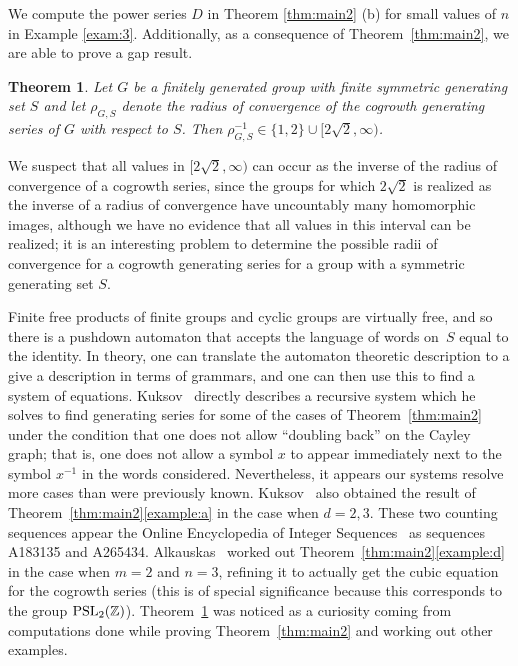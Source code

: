 \documentclass[11pt]{amsart}
\newtheorem{theorem}{Theorem}[section]
\theoremstyle{definition}
\begin{document}
We compute the power series $D$ in Theorem \ref{thm:main2} (b) for small values of $n$ in Example \ref{exam:3}. Additionally, as a consequence of Theorem~\ref{thm:main2}, we are able to prove a gap result.
\begin{theorem}\label{thm:main3}
Let $G$ be a finitely generated group with finite symmetric generating set $S$ and let $\rho_{G,S}$ denote the radius of convergence of the cogrowth generating series of $G$ with respect to $S$.  Then $\rho_{G,S}^{-1} \in \{1,2\}\cup [2\sqrt{2},\infty)$.
\end{theorem}
We suspect that all values in $[2\sqrt{2},\infty)$ can occur as the inverse of the radius of convergence of a cogrowth series, since the groups for which $2\sqrt{2}$ is realized as the inverse of a radius of convergence have uncountably many homomorphic images, although we have no evidence that all values in this interval can be realized; it is an interesting problem to determine the possible radii of convergence for a cogrowth generating series for a group with a symmetric generating set $S$.

Finite free products of finite groups and cyclic groups are virtually
free, and so there is a pushdown automaton that accepts the language of
words on~$S$ equal to the identity. In theory, one can translate the
automaton theoretic description to a give a description in terms of grammars, and one can then use this to find a
system of equations. Kuksov~\cite{kuksov} directly describes a
recursive system which he solves to find generating series for some of
the cases of Theorem~\ref{thm:main2} under the condition that one does
not allow ``doubling back'' on the Cayley graph; that is, one does not
allow a symbol $x$ to appear immediately next to the symbol $x^{-1}$
in the words considered. Nevertheless, it appears our systems resolve more cases
than were previously known.  Kuksov~\cite{kuksov} also obtained the
result of Theorem~\ref{thm:main2}\ref{example:a} in the case when
$d=2,3$. These two counting sequences appear the Online Encyclopedia
of Integer Sequences~\cite{oeis} as sequences A183135 and A265434.
Alkauskas~\cite{alkauskas} worked out Theorem~\ref{thm:main2}\ref{example:d}
in the case when $m=2$ and $n=3$, refining it to actually get the
cubic equation for the cogrowth series (this is of special
significance because this corresponds to the group ${\rm
  PSL}_2(\mathbb{Z})$).  Theorem~\ref{thm:main3} was noticed as a
curiosity coming from computations done while proving 
Theorem~\ref{thm:main2} and working out other examples.
\end{document}
